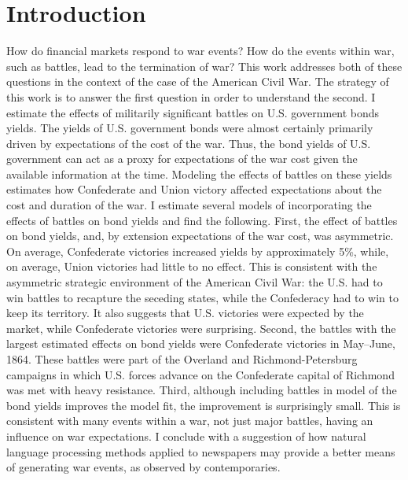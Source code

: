 





\section{Introduction}
\label{sec:introduction}


How do financial markets respond to war events?
How do the events within war, such as battles, lead to the termination of war?
This work addresses both of these questions in the context of the case of the American Civil War. 
The strategy of this work is to answer the first question in order to understand the second.
I estimate the effects of militarily significant battles on U.S. government bonds yields.
The yields of U.S. government bonds were almost certainly primarily driven by expectations of the cost of the war.
Thus, the bond yields of U.S. government can act as a proxy for expectations of the war cost given the available information at the time.
Modeling the effects of battles on these yields estimates how Confederate and Union victory affected expectations about the cost and duration of the war.
I estimate several models of incorporating the effects of battles on bond yields and find the following.
First, the effect of battles on bond yields, and, by extension expectations of the war cost, was asymmetric.
On average, Confederate victories increased yields by approximately 5\%, while, on average, Union victories had little to no effect.
This is consistent with the asymmetric strategic environment of the American Civil War: the U.S. had to win battles to recapture the seceding states, while the Confederacy had to win to keep its territory.
It also suggests that U.S. victories were expected by the market, while Confederate victories were surprising.
Second, the battles with the largest estimated effects on bond yields were Confederate victories in May--June, 1864.
These battles were part of the  Overland and Richmond-Petersburg campaigns in which U.S. forces advance on the Confederate capital of Richmond was met with heavy resistance.
Third, although including battles in model of the bond yields improves the model fit, the improvement is surprisingly small.
This is consistent with many events within a war, not just major battles, having an influence on war expectations.
I conclude with a suggestion of how natural language processing methods applied to newspapers may provide a better means of generating war events, as observed by contemporaries.

